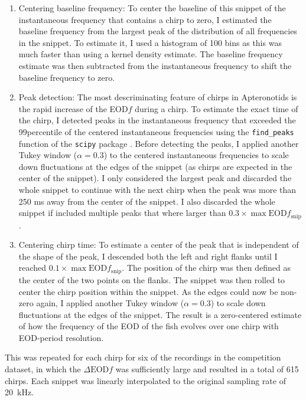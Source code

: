 \begin{enumerate}
  \item Centering baseline frequency: To center the baseline of this snippet of
    the instantaneous frequency that contains a chirp to zero, I estimated the
    baseline frequency from the largest peak of the distribution of all
    frequencies in the snippet. To estimate it, I used a histogram of 100 bins
    as this was much faster than using a kernel density estimate. The baseline
    frequency estimate was then subtracted from the instantaneous frequency to
    shift the baseline frequency to zero.

  \item Peak detection: The most descriminating feature of chirps in
    Apteronotids is the rapid increase of the EOD$f$ during a chirp. To
    estimate the exact time of the chirp, I detected peaks in the instantaneous
    frequency that exceeded the 99\th percentile of the centered instantaneous
    frequencies using the \texttt{find\_peaks} function of the \texttt{scipy}
    package \parencite{virtanenSciPyFundamentalAlgorithms2020}. Before
    detecting the peaks, I applied another Tukey window ($\alpha=0.3$) to the
    centered instantaneous frequencies to scale down fluctuations at the edges
    of the snippet (as chirps are expected in the center of the snippet). I
    only considered the largest peak and discarded the whole snippet to
    continue with the next chirp when the peak was more than 250
    \si{\milli\second} away from the center of the snippet. I also discarded
    the whole snippet if included multiple peaks that where larger than $0.3
    \times \max{\text{EOD}f_{\text{snip}}}$.

  \item Centering chirp time: To estimate a center of the peak that is
    independent of the shape of the peak, I descended both the left and right
    flanks until I reached $0.1 \times \max{\text{EOD}f_{\text{snip}}}$. The
    position of the chirp was then defined as the center of the two points on
    the flanks. The snippet was then rolled to center the chirp position within
    the snippet. As the edges could now be non-zero again, I applied another
    Tukey window ($\alpha=0.3$) to scale down fluctuations at the edges of the
    snippet. The result is a zero-centered estimate of how the frequency of the
    EOD of the fish evolves over one chirp with EOD-period resolution.

\end{enumerate}

This was repeated for each chirp for six of the recordings in the competition
dataset, in which the $\Delta\text{EOD}f$ was sufficiently large and resulted
in a total of 615 chirps. Each snippet was linearly interpolated to the
original sampling rate of \SI{20}{\kilo\hertz}.

